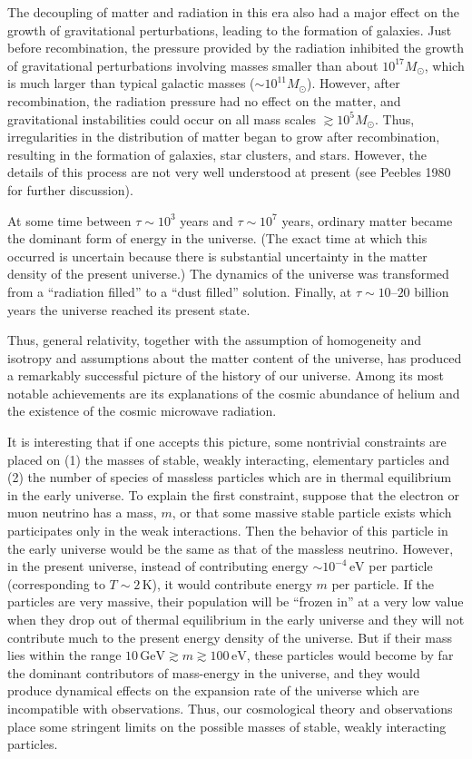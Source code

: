 The decoupling of matter and radiation in this era also had a major effect on the growth
of gravitational perturbations, leading to the formation of galaxies. Just before
recombination, the pressure provided by the radiation inhibited the growth of
gravitational perturbations involving masses smaller than about \(10^{17}M_\odot\),
which is much larger than typical galactic masses (\(\sim10^{11}M_\odot\)). However,
after recombination, the radiation pressure had no effect on the matter, and
gravitational instabilities could occur on all mass scales \(\gtrsim10^5M_\odot\). Thus,
irregularities in the distribution of matter began to grow after recombination,
resulting in the formation of galaxies, star clusters, and stars. However, the details of
this process are not very well understood at present (see Peebles 1980 for further
discussion).

At some time between \(\tau\sim10^3\) years and \(\tau\sim10^7\) years, ordinary
matter became the dominant form of energy in the universe. (The exact time at which
this occurred is uncertain because there is substantial uncertainty in the matter density
of the present universe.) The dynamics of the universe was transformed from a
``radiation filled'' to a ``dust filled'' solution. Finally, at \(\tau\sim10\text{--}20\)
billion years the universe reached its present state.

Thus, general relativity, together with the assumption of homogeneity and isotropy
and assumptions about the matter content of the universe, has produced a remarkably
successful picture of the history of our universe. Among its most notable achievements
are its explanations of the cosmic abundance of helium and the existence of the cosmic
microwave radiation.

It is interesting that if one accepts this picture, some nontrivial constraints are placed
on (1) the masses of stable, weakly interacting, elementary particles and (2) the number
of species of massless particles which are in thermal equilibrium in the early universe.
To explain the first constraint, suppose that the electron or muon neutrino has a mass,
\(m\), or that some massive stable particle exists which participates only in the weak
interactions. Then the behavior of this particle in the early universe would be the same
as that of the massless neutrino. However, in the present universe, instead of
contributing energy \(\sim10^{-4}\,\mathrm{eV}\) per particle (corresponding to
\(T\sim2\,\mathrm{K}\)), it would contribute energy \(m\) per particle. If the particles
are very massive, their population will be ``frozen in'' at a very low value when they
drop out of thermal equilibrium in the early universe and they will not contribute much
to the present energy density of the universe. But if their mass lies within the range
\(10\,\mathrm{GeV}\gtrsim m\gtrsim100\,\mathrm{eV}\), these particles would become by
far the dominant contributors of mass-energy in the universe, and they would produce
dynamical effects on the expansion rate of the universe which are incompatible with
observations. Thus, our cosmological theory and observations place some stringent
limits on the possible masses of stable, weakly interacting particles.

